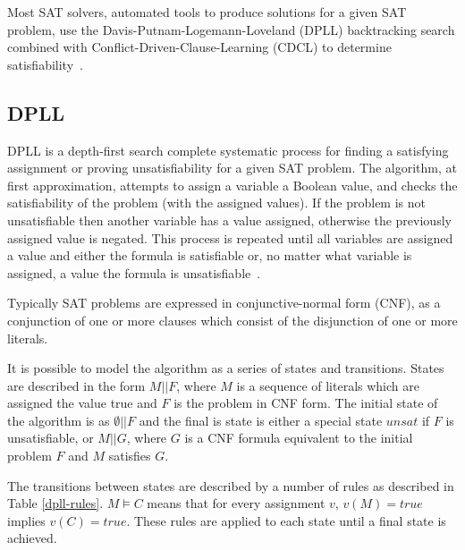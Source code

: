\documentclass[]{final_report}
\begin{document}
Most SAT solvers, automated tools to produce solutions for a given SAT problem, use the Davis-Putnam-Logemann-Loveland (DPLL) backtracking search combined with Conflict-Driven-Clause-Learning (CDCL) to determine satisfiability~\cite{zhang2001efficient, gomes2008satisfiability}.

\subsection{DPLL}
DPLL is a depth-first search complete systematic process for finding a satisfying assignment or proving unsatisfiability for a given SAT problem. The algorithm, at first approximation, attempts to assign a variable a Boolean value, and checks the satisfiability of the problem (with the assigned values). If the problem is not unsatisfiable then another variable has a value assigned, otherwise the previously assigned value is negated. This process is repeated until all variables are assigned a value and either the formula is satisfiable or, no matter what variable is assigned, a value the formula is unsatisfiable~\cite{sattosmt}.

Typically SAT problems are expressed in conjunctive-normal form (CNF), as a conjunction of one or more clauses which consist of the disjunction of one or more literals.

It is possible to model the algorithm as a series of states and transitions. States are described in the form $M || F$, where $M$ is a sequence of literals which are assigned the value true and $F$ is the problem in CNF form. The initial state of the algorithm is as $\emptyset || F $ and the final is state is either a special state $unsat$ if $F$ is unsatisfiable, or $M || G $, where $G$ is a CNF formula equivalent to the initial problem $F$ and $M$ satisfies $G$. 

The transitions between states are described by a number of rules as described in Table \ref{dpll-rules}. $M \models C$ means that for every assignment $v$, $v(M) = true$ implies $v(C) = true$. These rules are applied to each state until a final state is achieved.
\end{document}
